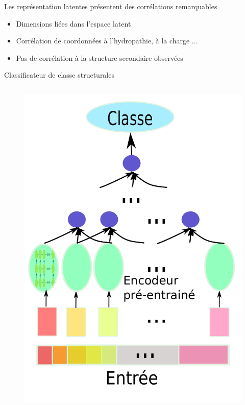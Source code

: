 \documentclass{beamer}
\begin{document}
\begin{frame}{Les représentation latentes présentent des corrélations remarquables}
    \begin{itemize}
    \item Dimensions liées dans l'espace latent\pause
    \item Corrélation de coordonnées à l'hydropathie, à la charge ...\pause
    \item Pas de corrélation à la structure secondaire observées
    \end{itemize}
  
\end{frame}


\begin{frame}{Classificateur de classe structurales}

  \begin{columns}
    \begin{figure}
      \centering
      \includegraphics[scale=0.16]{../Figures/Classd}
    \end{figure}


\end{columns}
\end{frame}
\end{document}

